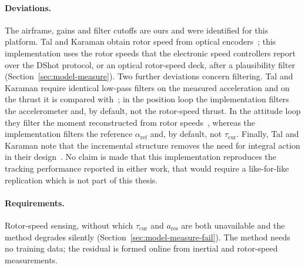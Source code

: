 \paragraph{Deviations.} The airframe, gains and filter cutoffs are ours and were identified for
this platform. Tal and Karaman obtain rotor speed from optical encoders~\cite{tal2018indi}; this
implementation uses the rotor speeds that the electronic speed controllers report over the DShot
protocol, or an optical rotor-speed deck, after a plausibility filter (Section~\ref{sec:model-measure}).
Two further deviations concern filtering. Tal and Karaman require identical low-pass filters on the
measured acceleration and on the thrust it is compared with~\cite{tal2018indi}; in the position
loop the implementation filters the accelerometer and, by default, not the rotor-speed thrust. In
the attitude loop they filter the moment reconstructed from rotor speeds~\cite{tal2018indi}, whereas
the implementation filters the reference $\alpha_{\mathrm{ref}}$ and, by default, not
$\tau_{\mathrm{cur}}$. Finally, Tal and Karaman note that the incremental structure removes the
need for integral action in their design~\cite{tal2018indi}. No claim is made that this
implementation reproduces the tracking performance reported in either work, that would require a
like-for-like replication which is not part of this thesis.

\paragraph{Requirements.} Rotor-speed sensing, without which $\tau_{\mathrm{cur}}$ and
$a_{\mathrm{res}}$ are both unavailable and the method degrades silently
(Section~\ref{sec:model-measure-fail}). The method needs no training data; the residual is formed
online from inertial and rotor-speed measurements.


